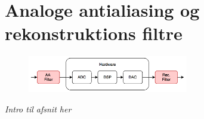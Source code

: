 \chapter{Analoge antialiasing og rekonstruktions filtre}\label{kap:analog_filter}

\begin{figure}[h]
	\vspace*{-1 cm}
	\includegraphics[width=7cm]{billeder/flow_filter}
	\vspace{0.5 cm}
\end{figure}

\emph{Intro til afsnit her}

